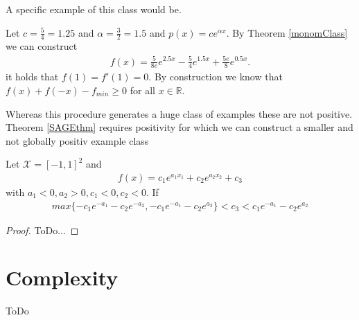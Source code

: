 \documentclass[./main.tex]{subfiles}
\begin{document}
A specific example of this class would be.
\begin{bsp}
Let $c=\frac 5 4 =1.25$ and $\alpha = \frac 3 2 = 1.5$ and $p(x)=ce^{\alpha x}$. By Theorem \ref{monomClass} we can construct
\begin{align*}
f(x)= \frac{5}{8e}e^{2.5x} -\frac 5 4 e^{1.5x}+\frac{5e}{8}e^{0.5x}.
\end{align*}
it holds that $f(1)=f'(1)=0$. By construction we know that $f(x)+f(-x)-f_{min}\geq 0$ for all $x \in \mathbb{R}$.
\end{bsp}
Whereas this procedure generates a huge class of examples these are not positive. Theorem \ref{SAGEthm} requires positivity for which we can construct a smaller and not globally positiv example class
\begin{thm}
Let $\mathcal{X}=[-1,1]^2$ and
\begin{align*}
f(x) = c_1e^{a_1x_1} + c_2e^{a_2x_2} + c_3 
\end{align*}
with $a_1<0, a_2>0, c_1<0, c_2<0$. If 
\begin{align*}
max \lbrace -c_1e^{-a_1} -c_2e^{-a_2},-c_1e^{-a_1} -c_2e^{a_2} \rbrace < c_3 < c_1e^{-a_1}-c_2e^{a_2}
\end{align*}
\end{thm}
\begin{proof}
ToDo...
\end{proof}



\section{Complexity}
ToDo
\end{document}
